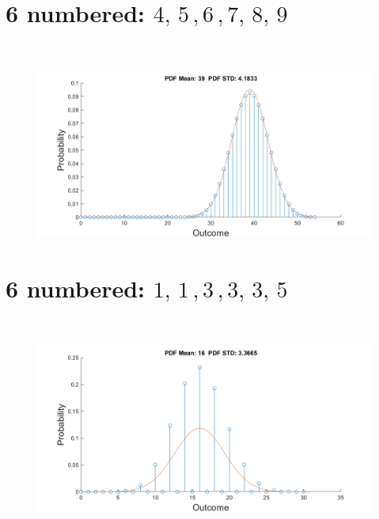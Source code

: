 \documentclass[12pt,letterpaper, onecolumn]{exam}
\begin{document}
\begin{questions}
\begin{parts}
            \part{6 numbered: $4,\,5\,,6\,,7,\,8,\,9$}\\
                \solution
                    \begin{figure}[!h]
                        \centering
                        \includegraphics[width=.91\linewidth]{Q1_b.png}
                    \end{figure}                    
            \part{6 numbered: $1,\,1\,,3\,,3,\,3,\,5$}\\
                \solution
                    \begin{figure}[!h]
                        \centering
                        \includegraphics[width=.91\linewidth]{Q1_c.png}
                    \end{figure}                
\clearpage                    

\end{parts}
\end{questions}
\end{document}
